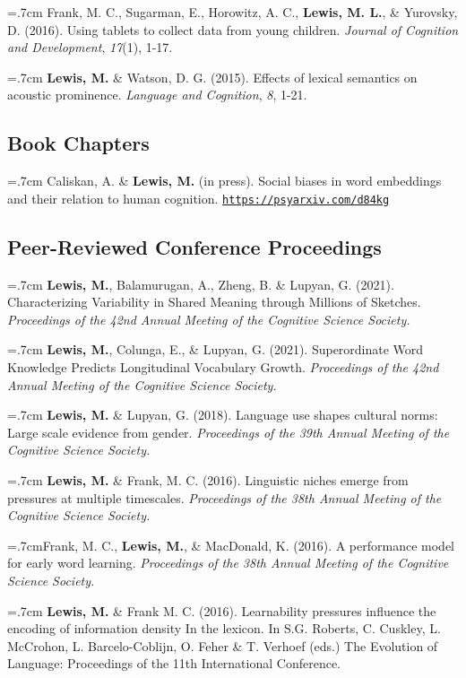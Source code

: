 \documentclass[letterpaper]{article}
\begin{document}
 \hangindent=.7cm Frank, M. C., Sugarman, E., Horowitz, A. C., {\bf Lewis, M. L.}, \& Yurovsky, D. (2016). Using tablets to collect data from young children. {\it Journal of Cognition and Development}, {\it 17}(1), 1-17.

  \hangindent=.7cm {\bf Lewis, M.} \& Watson, D. G. (2015). Effects of lexical semantics on acoustic prominence. { \it Language and Cognition}, {\it 8}, 1-21.
  
  \subsection*{Book Chapters}

\onehalfspacing



\hangindent=.7cm Caliskan, A. \& {\bf Lewis, M.} (in press). Social biases in word embeddings and their relation to human cognition. \href{hhttps://psyarxiv.com/d84kg}{\tt https://psyarxiv.com/d84kg}

  \subsection*{Peer-Reviewed Conference Proceedings}
  
      \hangindent=.7cm {\bf Lewis, M.},  Balamurugan, A., Zheng, B. \& Lupyan, G. (2021). Characterizing Variability in Shared Meaning through Millions of Sketches.   { \it Proceedings of the 42nd Annual Meeting of the Cognitive Science Society.}
      
 \hangindent=.7cm {\bf Lewis, M.}, Colunga, E., \& Lupyan, G. (2021).  Superordinate Word Knowledge Predicts Longitudinal Vocabulary Growth.  { \it Proceedings of the 42nd Annual Meeting of the Cognitive Science Society.}
          

    \hangindent=.7cm {\bf Lewis, M.} \& Lupyan, G. (2018). Language use shapes cultural norms: Large scale evidence from gender.  { \it Proceedings of the 39th Annual Meeting of the Cognitive Science Society.}

  \hangindent=.7cm {\bf Lewis, M.} \& Frank, M. C. (2016). Linguistic niches emerge from pressures at multiple timescales. { \it Proceedings of the 38th Annual Meeting of the Cognitive Science Society.}

   \hangindent=.7cmFrank, M. C.,  {\bf Lewis, M.}, \& MacDonald, K. (2016). A performance model for early word learning.  { \it Proceedings of the 38th Annual Meeting of the Cognitive Science Society.}

  \hangindent=.7cm {\bf Lewis, M.} \& Frank M. C. (2016). Learnability pressures influence the encoding of information density In the lexicon. In S.G. Roberts, C. Cuskley, L. McCrohon, L. Barcelo-Coblijn, O. Feher \& T. Verhoef (eds.) The Evolution of Language: Proceedings of the 11th International Conference.
\end{document}
